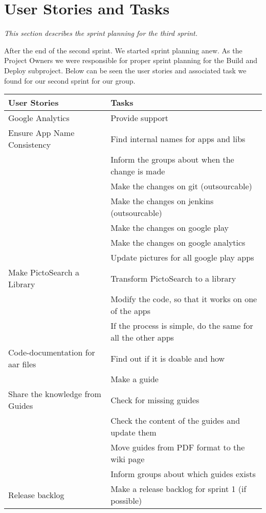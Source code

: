 \section{User Stories and Tasks} \label{Sprint3_SecUserStoriesAndTasks}
\textit{This section describes the sprint planning for the third sprint.}

After the end of the second sprint. We started sprint planning anew. As the Project Owners we were responsible for proper sprint planning for the Build and Deploy subproject. Below can be seen the user stories and associated task we found for our second sprint for our group.

\begin{table}
	\centering
	\begin{tabular}{ll}
		\textbf{User Stories} & \textbf{Tasks}\\ \hline \noalign{\vskip 2mm}
		Google Analytics & Provide support\\ \hline
		Ensure App Name Consistency & Find internal names for apps and libs \\
		& Inform the groups about when the change is made\\
		& Make the changes on git (outsourcable) \\
		& Make the changes on jenkins (outsourcable) \\
		& Make the changes on google play \\
		& Make the changes on google analytics \\
		& Update pictures for all google play apps\\ \hline
		Make PictoSearch a Library & Transform PictoSearch to a library \\
		& Modify the code, so that it works on one of the apps \\
		& If the process is simple, do the same for all the other apps \\ \hline
		Code-documentation for aar files & Find out if it is doable and how \\
		& Make a guide \\ \hline
		Share the knowledge from Guides & Check for missing guides \\
		& Check the content of the guides and update them \\
		& Move guides from PDF format to the wiki page \\
		& Inform groups about which guides exists \\ \hline
		Release backlog &  Make a release backlog for sprint 1 (if possible) \\

\end{tabular}
\end{table}
